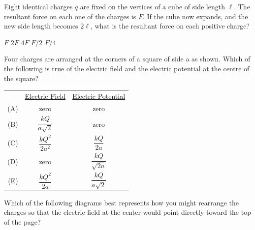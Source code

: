 \documentclass{../../../oss-apphys-exam}
\begin{document}
\begin{questions}
  \question Eight identical charges $q$ are fixed on the vertices of a cube
  of side length $\ell$. The resultant force on each one of the charges is
  $F$. If the cube now expands, and the new side length becomes $2\ell$, what
  is the resultant force on each positive charge?
  \begin{choices}
    \choice $F$
    \choice $2F$
    \choice $4F$
    \choice $F/2$
    \choice $F/4$
  \end{choices}
    
  \question Four charges are arranged at the corners of a square of side a as
  shown. Which of the following is true of the electric field and the electric
  potential at the centre of the square?
  \begin{center}
  \end{center}
  \begin{tabular}{rcc}
    & \underline{Electric Field} & \underline{Electric Potential}\\
    (A) & zero & zero \\
    (B) & $\dfrac{kQ}{a\sqrt 2}$ & zero \\
    (C) & $\dfrac{kQ^2}{2a^2}$ &  $\dfrac{kQ}{2a}$\\
    (D) & zero &  $\dfrac{kQ}{\sqrt{2a}}$\\
    (E) & $\dfrac{kQ^2}{2a}$ & $\dfrac{kQ}{a\sqrt 2}$
  \end{tabular}
    
  \question Which of the following diagrams best represents how you might
  rearrange the charges so that the electric field at the center would point
  directly toward the top of the page?
  

\end{questions}
\end{document}
